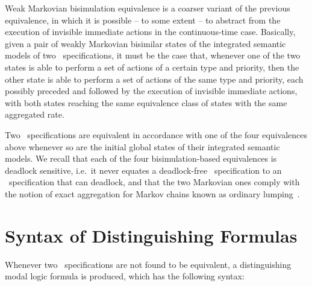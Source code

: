 Weak Markovian bisimulation equivalence is a coarser variant of the previous equivalence, in which it is
possible -- to some extent -- to abstract from the execution of invisible immediate actions in the
continuous-time case. Basically, given a pair of weakly Markovian bisimilar states of the integrated
semantic models of two \aemilia\ specifications, it must be the case that, whenever one of the two states is
able to perform a set of actions of a certain type and priority, then the other state is able to perform a
set of actions of the same type and priority, each possibly preceded and followed by the execution of
invisible immediate actions, with both states reaching the same equivalence class of states with the same
aggregated rate.

Two \aemilia\ specifications are equivalent in accordance with one of the four equivalences above whenever
so are the initial global states of their integrated semantic models. We recall that each of the four
bisimulation-based equivalences is deadlock sensitive, i.e.\ it never equates a deadlock-free \aemilia\
specification to an \aemilia\ specification that can deadlock, and that the two Markovian ones comply with
the notion of exact aggregation for Markov chains known as ordinary lumping~\cite{Buc,Hil}.



\section{Syntax of Distinguishing Formulas}\label{disting_formula}

Whenever two \aemilia\ specifications are not found to be equivalent, a distinguishing modal logic formula
is produced, which has the following syntax:

